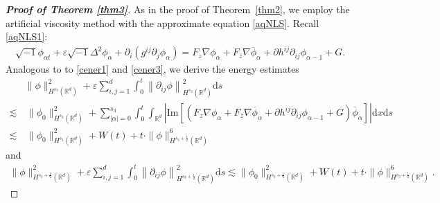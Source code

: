 \documentclass[10pt,a4paper]{amsart}
\begin{document}
\begin{proof}[\textbf{Proof of Theorem \ref{thm3}}]
As in the proof of Theorem~\ref{thm2}, we employ the artificial viscosity method with the approximate equation \eqref{aqNLS}. Recall \eqref{aqNLS1}:
	\begin{align*}  
		\sqrt{-1}\phi_{\alpha t}+	\varepsilon\sqrt{-1}\Delta^2 \phi_\alpha+\partial_i\left( g^{ij} \partial_j \phi_{\alpha }\right)=F_z\nabla \phi_\alpha+F_{\overline{z}}\nabla \overline{\phi}_\alpha+\partial h^{ij}\partial_{ij } \phi_{\alpha -1}+G.
	\end{align*}
Analogous to to \eqref{cener1} and \eqref{cener3},
we derive the energy estimates
	\begin{align*}
		&	\| \phi\|_{H^{s_3 }(\mathbb{R}^d)}^2+\varepsilon  \sum_{i,j=1}^d\int_0^t\left\| \partial_{ij}\phi\right\|_{H^{s_3}(\mathbb{R}^d)}^2 \mathrm{d} s\\
		\lesssim &\, 		\| \phi_0\|_{H^{s_3 }(\mathbb{R}^d)}^2+\sum_{|\alpha|=0}^{s_3}\int_0^t\int_{\mathbb{R}^d} \left| \mathrm{Im} \left[  \left(F_z\nabla \phi_\alpha+F_{\overline{z}}\nabla \overline{\phi}_\alpha+\partial h^{ij}\partial_{ij } \phi_{\alpha -1}+G\right)\overline{\phi}_{\alpha }\right]\right| \mathrm{d} x\mathrm{d} s\\
		\lesssim &\,\| \phi_0\|_{H^{s_3 }(\mathbb{R}^d)}^2+W(t)+t\cdot\|\phi\|_{H^{s_3+\frac12}(\mathbb{R}^{d})}^6 \nonumber
	\end{align*}
	and 
	\begin{align} \label{acener3}
		\|\phi\|_{H^{s_3+\frac12}(\mathbb{R}^{d})}^2+\varepsilon  \sum_{i,j=1}^d\int_0^t\left\| \partial_{ij}\phi\right\|_{H^{s_3+\frac 12}(\mathbb{R}^d)}^2 \mathrm{d} s\lesssim 	\|\phi_0\|_{H^{s_3+\frac12}(\mathbb{R}^{d})}^2+ W(t)+t\cdot\|\phi\|_{H^{s_3+\frac12}(\mathbb{R}^{d})}^6.
	\end{align}
	
	
	

\end{proof}
\end{document}
